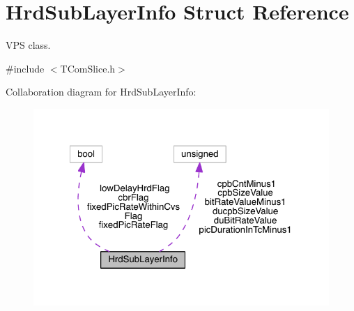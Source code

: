 \hypertarget{struct_hrd_sub_layer_info}{}\section{Hrd\+Sub\+Layer\+Info Struct Reference}
\label{struct_hrd_sub_layer_info}


V\+PS class.  




{\ttfamily \#include $<$T\+Com\+Slice.\+h$>$}



Collaboration diagram for Hrd\+Sub\+Layer\+Info\+:
\nopagebreak
\begin{figure}[H]
\begin{center}
\leavevmode
\includegraphics[width=322pt]{df/def/struct_hrd_sub_layer_info__coll__graph}
\end{center}
\end{figure}
